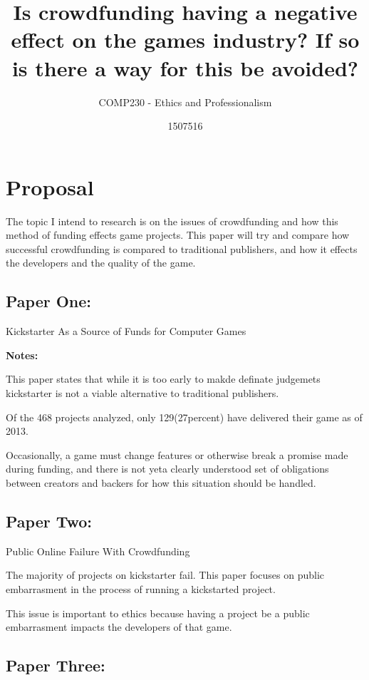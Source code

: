 \documentclass{scrartcl}
\title{Is crowdfunding having a negative effect on the games industry? If so is there a way for this be avoided? }
\subtitle{COMP230 - Ethics and Professionalism}
\author{1507516}
\begin{document}
\maketitle

\section{Proposal}

The topic I intend to research is on the issues of crowdfunding and how this method of funding effects game projects. This paper will try and  compare how successful crowdfunding is compared to traditional publishers, and how it effects the developers and the quality of the game. 



\subsection{Paper One:}

Kickstarter As a Source of Funds for Computer Games
\cite{Harris:2013}

\textbf{Notes:}

This paper states that while it is too early to makde definate judgemets kickstarter is not a viable alternative to traditional publishers.

Of the 468 projects analyzed, only 129(27percent) have delivered their game as of 2013.

Occasionally, a game must change features or otherwise break a promise made during funding, 
and there is not yeta clearly understood set of obligations between creators and backers for how this situation should be handled.


\subsection{Paper Two:}

Public Online Failure With Crowdfunding
\cite{Greenberg:2015}

The majority of projects on kickstarter fail. This paper focuses on public embarrasment in the process of running a kickstarted project.

This issue is important to ethics because having a project be a public embarrasment impacts the developers of that game.


\subsection{Paper Three:}
\end{document}
